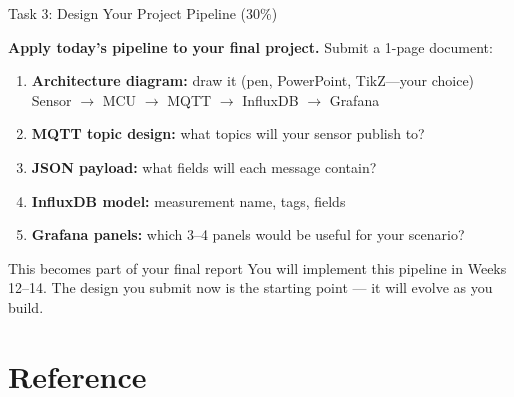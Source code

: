 \documentclass[aspectratio=169,11pt]{beamer}
\begin{document}
\begin{frame}{Task 3: Design Your Project Pipeline (30\%)}

    \vspace{0.2cm}
    \textbf{Apply today's pipeline to your final project.} Submit a 1-page document:

    \vspace{0.2cm}
    \begin{enumerate}
        \item \textbf{Architecture diagram:} draw it (pen, PowerPoint, TikZ---your choice)\\
              {\small Sensor $\rightarrow$ MCU $\rightarrow$ MQTT $\rightarrow$ InfluxDB $\rightarrow$ Grafana}
        \item \textbf{MQTT topic design:} what topics will your sensor publish to?
        \item \textbf{JSON payload:} what fields will each message contain?
        \item \textbf{InfluxDB model:} measurement name, tags, fields
        \item \textbf{Grafana panels:} which 3--4 panels would be useful for your scenario?
    \end{enumerate}

    \vspace{0.2cm}
    \begin{alertblock}{This becomes part of your final report}
        You will implement this pipeline in Weeks 12--14. The design you submit now is the starting point --- it will evolve as you build.
    \end{alertblock}
\end{frame}

\section{Reference}
\end{document}
